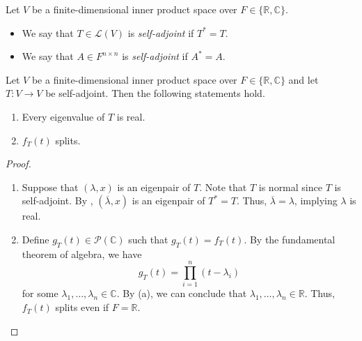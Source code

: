 \begin{definition}
  Let $V$ be a finite-dimensional inner product space over
  $F \in \{\mathbb{R}, \mathbb{C}\}$.
  \begin{itemize}
    \item We say that $T \in \mathcal{L}(V)$ is \emph{self-adjoint} if
    $T^* = T$.
    \item We say that $A \in F^{n \times n}$ is \emph{self-adjoint} if
    $A^* = A$.
  \end{itemize}
\end{definition}

\begin{theorem}
  \label{thm:self-adjoint-properties}
  Let $V$ be a finite-dimensional inner product space over $F \in \{\mathbb{R},
  \mathbb{C}\}$ and let $T: V \to V$ be self-adjoint.
  Then the following statements hold.
  \begin{enumerate}
    \item Every eigenvalue of $T$ is real.
    \item $f_T(t)$ splits.
  \end{enumerate}
\end{theorem}
\begin{proof}
  \leavevmode
  \begin{enumerate}
    \item Suppose that $(\lambda, x)$ is an eigenpair of $T$.
    Note that $T$ is normal since $T$ is self-adjoint.
    By , $(\overline\lambda, x)$ is an eigenpair of
    $T^* = T$.
    Thus, $\overline\lambda = \lambda$, implying $\lambda$ is real.

    \item Define $g_T(t) \in \mathcal{P}(\mathbb{C})$ such that
    $g_T(t) = f_T(t)$.
    By the fundamental theorem of algebra, we have
    \begin{equation*}
      g_T(t) = \prod_{i=1}^n (t - \lambda_i)
    \end{equation*}
    for some $\lambda_1, \dots, \lambda_n \in \mathbb{C}$.
    By (a), we can conclude that $\lambda_1, \dots, \lambda_n \in \mathbb{R}$.
    Thus, $f_T(t)$ splits even if $F = \mathbb{R}$.
    \qedhere
  \end{enumerate}
\end{proof}

